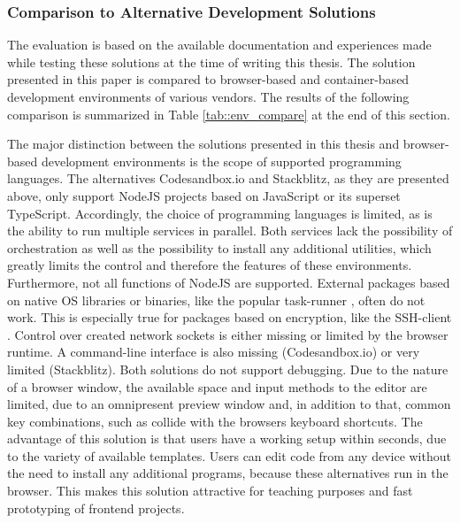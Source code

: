     \subsubsection{Comparison to Alternative Development Solutions}
    The evaluation is based on the available documentation and experiences made while testing these solutions at the time of writing this thesis. The solution presented in this paper is compared to browser-based and container-based development environments of various vendors. The results of the following comparison is summarized in Table \ref{tab::env_compare} at the end of this section.

        The major distinction between the solutions presented in this thesis and browser-based development environments is the scope of supported programming languages. The alternatives Codesandbox.io and Stackblitz, as they are presented above, only support NodeJS projects based on JavaScript or its superset TypeScript. Accordingly, the choice of programming languages is limited, as is the ability to run multiple services in parallel. Both services lack the possibility of orchestration as well as the possibility to install any additional utilities, which greatly limits the control and therefore the features of these environments. \newline
        Furthermore, not all functions of NodeJS are supported. External packages based on native \ac{OS} libraries or binaries, like the popular task-runner , often do not work. This is especially true for packages based on encryption, like the \ac{SSH}-client . Control over created network sockets is either missing or limited by the browser runtime. A command-line interface is also missing (Codesandbox.io) or very limited (Stackblitz). Both solutions do not support debugging. Due to the nature of a browser window, the available space and input methods to the editor are limited, due to an omnipresent preview window and, in addition to that, common key combinations, such as  collide with the browsers keyboard shortcuts.\newline
        The advantage of this solution is that users have a working setup within seconds, due to the variety of available templates. Users can edit code from any device without the need to install any additional programs, because these alternatives run in the browser. This makes this solution attractive for teaching purposes and fast prototyping of frontend projects.\newline
